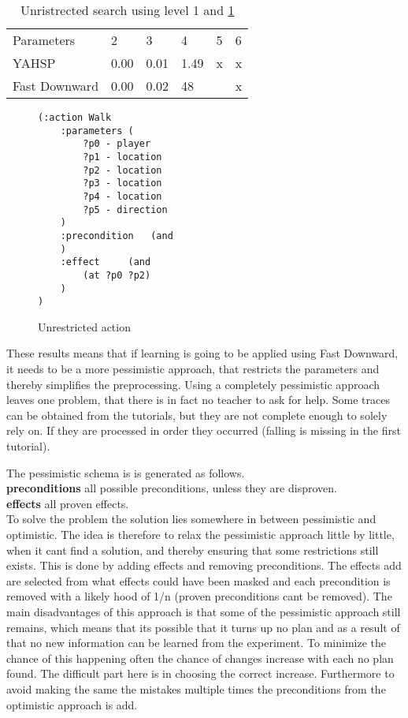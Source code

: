 \begin{table}
	\centering
	\caption{Unristrected search using level 1 and \ref{unrestricted}}
	\label{un-table}
	\begin{tabular}{llllll}
		Parameters & 2 & 3 & 4 & 5 & 6 \\
		YAHSP& 0.00 & 0.01  & 1.49 & x & x\\
		Fast Downward & 0.00 & 0.02 & 48 &  & x \\

	\end{tabular}
\end{table}
\begin{figure}
	\caption{Unrestricted action}
	\label{unrestricted}

\begin{lstlisting}
(:action Walk
	:parameters (
		?p0 - player
		?p1 - location
		?p2 - location
		?p3 - location
		?p4 - location
		?p5 - direction
	)
	:precondition 	(and
	)
	:effect 	(and
		(at ?p0 ?p2)
	)
)
\end{lstlisting}
\end{figure}


These results means that if learning is going to be applied using Fast Downward, it needs to be a more pessimistic approach, that restricts the parameters and thereby simplifies the preprocessing. Using a completely pessimistic approach leaves one problem, that there is in fact no teacher to ask for help. Some traces can be obtained from the tutorials, but they are not complete enough to solely rely on. If they are processed in order they occurred (falling is missing in the first tutorial).  

The pessimistic schema is is generated as follows.\\
\textbf{preconditions}
all possible preconditions, unless they are disproven.\\
\textbf{effects}
all proven effects.\\

To solve the problem the solution lies somewhere in between pessimistic and optimistic. The idea is therefore to relax the pessimistic approach little by little, when it cant find a solution, and thereby ensuring that some restrictions still exists. This is done by adding effects and removing preconditions. The effects add are selected from what effects could have been masked and each precondition is removed with a likely hood of 1/n (proven preconditions cant be removed). The main disadvantages of this approach is that some of the pessimistic approach still remains, which means that its possible that it turns up no plan and as a result of that no new information can be learned from the experiment. To minimize the chance of this happening often the chance of changes increase with each no plan found. The difficult part here is in choosing the correct increase. Furthermore to avoid making the same the mistakes multiple times the preconditions from the optimistic approach is add.  

